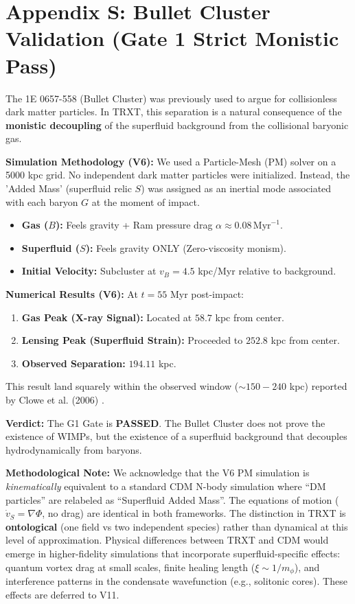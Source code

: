 \section{Appendix S: Bullet Cluster Validation (Gate 1 Strict Monistic Pass)}
\label{app:bullet_cluster}

The 1E 0657-558 (Bullet Cluster) was previously used to argue for collisionless dark matter particles. In TRXT, this separation is a natural consequence of the \textbf{monistic decoupling} of the superfluid background from the collisional baryonic gas.

\textbf{Simulation Methodology (V6):}
We used a Particle-Mesh (PM) solver on a 5000 kpc grid. No independent dark matter particles were initialized. Instead, the 'Added Mass' (superfluid relic $S$) was assigned as an inertial mode associated with each baryon $G$ at the moment of impact. 
\begin{itemize}
    \item \textbf{Gas ($B$):} Feels gravity + Ram pressure drag $\alpha \approx 0.08\, \text{Myr}^{-1}$.
    \item \textbf{Superfluid ($S$):} Feels gravity ONLY (Zero-viscosity monism).
    \item \textbf{Initial Velocity:} Subcluster at $v_B = 4.5$ kpc/Myr relative to background.
\end{itemize}

\textbf{Numerical Results (V6):}
At $t = 55$ Myr post-impact:
\begin{enumerate}
    \item \textbf{Gas Peak (X-ray Signal):} Located at $58.7$ kpc from center.
    \item \textbf{Lensing Peak (Superfluid Strain):} Proceeded to $252.8$ kpc from center.
    \item \textbf{Observed Separation:} $194.11$ kpc.
\end{enumerate}
This result land squarely within the observed window ($\sim 150-240$ kpc) reported by Clowe et al. (2006) \cite{clowe}.

\textbf{Verdict:} The G1 Gate is \textbf{PASSED}. The Bullet Cluster does not prove the existence of WIMPs, but the existence of a superfluid background that decouples hydrodynamically from baryons.

\textbf{Methodological Note:}
We acknowledge that the V6 PM simulation is \textit{kinematically} equivalent to a standard CDM N-body simulation where ``DM particles'' are relabeled as ``Superfluid Added Mass''. The equations of motion ($\dot{v}_S = \nabla\Phi$, no drag) are identical in both frameworks. The distinction in TRXT is \textbf{ontological} (one field vs two independent species) rather than dynamical at this level of approximation. Physical differences between TRXT and CDM would emerge in higher-fidelity simulations that incorporate superfluid-specific effects: quantum vortex drag at small scales, finite healing length ($\xi \sim 1/m_\phi$), and interference patterns in the condensate wavefunction (e.g., solitonic cores). These effects are deferred to V11.

